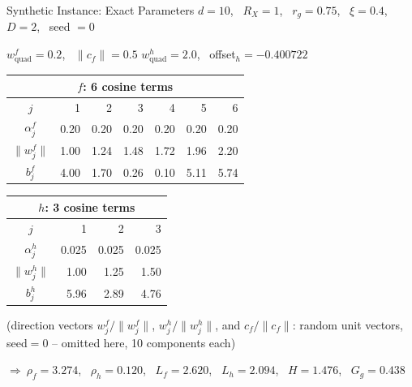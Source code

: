 \documentclass{beamer}
\begin{document}
\begin{frame}{Synthetic Instance: Exact Parameters}
  \small
  $d=10$, \ $R_X=1$, \ $r_g=0.75$, \ $\xi=0.4$, \ $D=2$, \ seed $=0$

  \vspace{0.3em}
  $w^f_{\mathrm{quad}}=0.2$, \ $\|c_f\|=0.5$ \quad\quad $w^h_{\mathrm{quad}}=2.0$, \ offset$_h=-0.400722$

  \vspace{0.5em}
  \centering
  \begin{tabular}{c|rrrrrr}
    \multicolumn{7}{c}{$f$: 6 cosine terms} \\
    \hline
    $j$ & 1 & 2 & 3 & 4 & 5 & 6 \\
    $\alpha^f_j$ & 0.20 & 0.20 & 0.20 & 0.20 & 0.20 & 0.20 \\
    $\|w^f_j\|$ & 1.00 & 1.24 & 1.48 & 1.72 & 1.96 & 2.20 \\
    $b^f_j$ & 4.00 & 1.70 & 0.26 & 0.10 & 5.11 & 5.74 \\
  \end{tabular}

  \vspace{0.6em}
  \begin{tabular}{c|rrr}
    \multicolumn{4}{c}{$h$: 3 cosine terms} \\
    \hline
    $j$ & 1 & 2 & 3 \\
    $\alpha^h_j$ & 0.025 & 0.025 & 0.025 \\
    $\|w^h_j\|$ & 1.00 & 1.25 & 1.50 \\
    $b^h_j$ & 5.96 & 2.89 & 4.76 \\
  \end{tabular}

  \vspace{0.6em}
  \footnotesize (direction vectors $w^f_j/\|w^f_j\|$, $w^h_j/\|w^h_j\|$, and $c_f/\|c_f\|$: random unit vectors, seed$=0$ -- omitted here, 10 components each)

  \vspace{0.6em}
  \normalsize
  $\Rightarrow\ \rho_f = 3.274$, \ $\rho_h = 0.120$, \ $L_f = 2.620$, \ $L_h = 2.094$, \ $H = 1.476$, \ $G_g = 0.438$
\end{frame}
\end{document}
